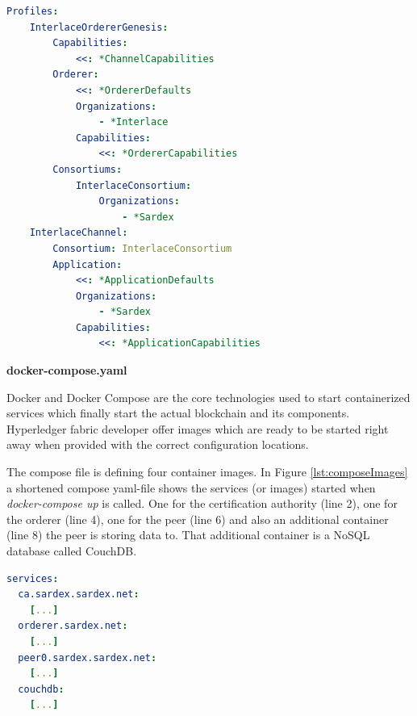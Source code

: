 \begin{center}
\begin{minipage}{0.8\textwidth}
\small
\begin{lstlisting}[language=yaml,firstnumber=1,caption={\bf\small configtx.yaml excerpt - Profiles definition}, captionpos=b,label=lst:configTxProfiles]
Profiles:
    InterlaceOrdererGenesis:
        Capabilities:
            <<: *ChannelCapabilities
        Orderer:
            <<: *OrdererDefaults
            Organizations:
                - *Interlace
            Capabilities:
                <<: *OrdererCapabilities
        Consortiums:
            InterlaceConsortium:
                Organizations:
                    - *Sardex
    InterlaceChannel:
        Consortium: InterlaceConsortium
        Application:
            <<: *ApplicationDefaults
            Organizations:
                - *Sardex
            Capabilities:
                <<: *ApplicationCapabilities
\end{lstlisting}
\end{minipage}
\end{center}

\textbf{docker-compose.yaml}

Docker and Docker Compose are the core technologies used to start containerized services which finally start the actual blockchain and its components. Hyperledger fabric developer offer images which are ready to be started right away when provided with the correct configuration locations.

The compose file is defining four container images. In Figure \ref{lst:composeImages} a shortened compose yaml-file shows the services (or images) started when \textit{docker-compose up} is called. One for the certification authority (line 2), one for the orderer (line 4), one for the peer (line 6) and also an additional container (line 8) the peer is storing data to. That additional container is a NoSQL database called CouchDB. 

\begin{center}
\begin{minipage}{0.8\textwidth}
\small
\begin{lstlisting}[language=yaml,firstnumber=1,caption={\bf\small docker-compose.yaml excerpt}, captionpos=b,label=lst:composeImages]
services:
  ca.sardex.sardex.net:
    [...]
  orderer.sardex.net:
    [...]
  peer0.sardex.sardex.net:
    [...]
  couchdb:
    [...]
\end{lstlisting}
\end{minipage}
\end{center}

